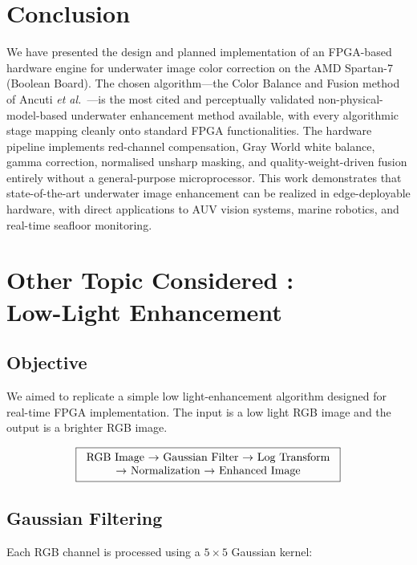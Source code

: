 \documentclass[10pt,twocolumn,letterpaper]{article}
\begin{document}
\section{Conclusion}
\label{sec:conclusion}

We have presented the design and planned implementation of an FPGA-based
hardware engine for underwater image color correction on the AMD
Spartan-7 (Boolean Board). The chosen algorithm---the Color Balance and
Fusion method of Ancuti \emph{et al.}~\cite{ancuti2018color}---is the most
cited and perceptually validated non-physical-model-based underwater
enhancement method available, with every algorithmic stage mapping cleanly
onto standard FPGA functionalities. The hardware pipeline implements red-channel
compensation, Gray World white balance, gamma correction, normalised unsharp
masking, and quality-weight-driven fusion entirely without a general-purpose microprocessor. This
work demonstrates that state-of-the-art underwater image enhancement can be
realized in edge-deployable hardware, with direct applications to AUV
vision systems, marine robotics, and real-time seafloor monitoring.

\section{Other Topic Considered : \\Low-Light Enhancement}

\subsection{Objective}
We aimed to replicate a simple low light-enhancement algorithm designed for real-time FPGA implementation. The input is a low light RGB image and the output is a brighter RGB image.

\[
\boxed{
\begin{tabular}{c}
\text{RGB Image} $\rightarrow$ \text{Gaussian Filter} $\rightarrow$ \text{Log Transform} \\
$\rightarrow$ \text{Normalization} $\rightarrow$ \text{Enhanced Image}
\end{tabular}
}
\]

\subsection{Gaussian Filtering}

Each RGB channel is processed using a $5\times5$ Gaussian kernel:
\end{document}
